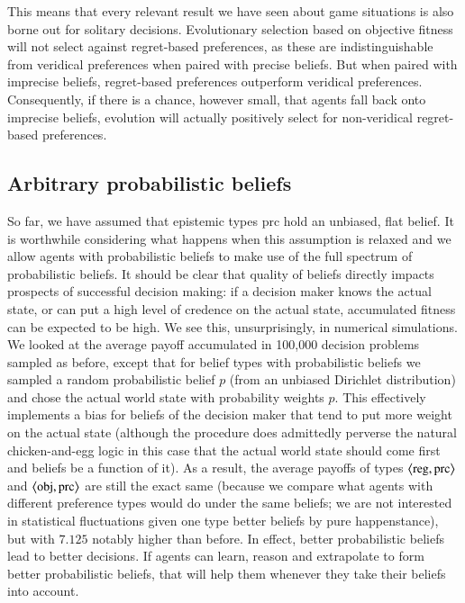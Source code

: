 \documentclass[fleqn,reqno,11pt]{article}
\begin{document}
This means that every relevant result we have seen about game situations is also borne out for
solitary decisions. Evolutionary selection based on objective fitness will not select against
regret-based preferences, as these are indistinguishable from veridical preferences
when paired with precise beliefs. But when paired with imprecise beliefs, regret-based
preferences outperform veridical preferences. Consequently, if there is a chance, however
small, that agents fall back onto imprecise beliefs, evolution will actually positively select
for non-veridical regret-based preferences.


\iffalse
\subsection{Arbitrary probabilistic beliefs}
\label{sec:arbitr-prob-beli}

So far, we have assumed that epistemic types $\text{prc}$ hold an unbiased, flat belief. It is
worthwhile considering what happens when this assumption is relaxed and we allow agents with
probabilistic beliefs to make use of the full spectrum of probabilistic beliefs. It should be
clear that quality of beliefs directly impacts prospects of successful decision making: if a
decision maker knows the actual state, or can put a high level of credence on the actual state,
accumulated fitness can be expected to be high. We see this, unsurprisingly, in numerical
simulations. We looked at the average payoff accumulated in 100,000 decision problems sampled
as before, except that for belief types with probabilistic beliefs we sampled a random
probabilistic belief $p$ (from an unbiased Dirichlet distribution) and chose the actual world
state with probability weights $p$. This effectively implements a bias for beliefs of the
decision maker that tend to put more weight on the actual state (although the procedure does
admittedly perverse the natural chicken-and-egg logic in this case that the actual world state
should come first and beliefs be a function of it). As a result, the average payoffs of types
$\left \langle \text{reg}, \text{prc}\right\rangle$ and $\left \langle \text{obj}, \text{prc}\right\rangle$ are still the exact same
(because we compare what agents with different preference types would do under the same
beliefs; we are not interested in statistical fluctuations given one type better beliefs by
pure happenstance), but with $7.125$ notably higher than before. In effect, better
probabilistic beliefs lead to better decisions. If agents can learn, reason and extrapolate to
form better probabilistic beliefs, that will help them whenever they take their beliefs into
account. 
\end{document}
